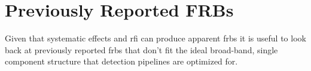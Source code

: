 \documentclass[a4paper,fleqn,usenatbib]{mnras}
\begin{document}
\section{Previously Reported FRBs}
\label{sec:previous_frbs}

Given that systematic effects and \gls{rfi} can produce apparent \glspl{frb} it
is useful to look back at previously reported \glspl{frb} that don't fit the
ideal broad-band, single component structure that detection pipelines are
optimized for.

\end{document}
